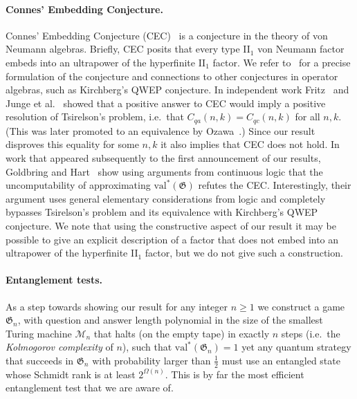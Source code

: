\documentclass[11pt]{article}
\theoremstyle{definition}
\newcommand{\val}{\ensuremath{\mathrm{val}}}
\newcommand{\game}{\mathfrak{G}}
\renewcommand{\cal}[1]{\mathcal{#1}}
\begin{document}
\paragraph{Connes' Embedding Conjecture.} 
Connes' Embedding Conjecture (CEC)~\cite{connes1976classification} is a conjecture in the theory of von Neumann algebras. Briefly, CEC posits that every type II$_1$ von Neumann factor embeds into an ultrapower of the hyperfinite II$_1$ factor. We refer to~\cite{ozawa2013connes} for a precise formulation of the conjecture and connections to other conjectures in operator algebras, such as  Kirchberg's QWEP conjecture. In independent work Fritz~\cite{fritz2012tsirelson} and Junge et al.~\cite{junge2011connes} showed that a positive answer to CEC would imply a positive resolution of Tsirelson's problem, i.e.\ that $C_{qa}(n,k)=C_{qc}(n,k)$ for all $n,k$. (This was later promoted to an equivalence by Ozawa~\cite{ozawa2013connes}.) Since our result disproves this equality for some $n,k$ it also implies that CEC does not hold. In work that appeared subsequently to the first announcement of our results, Goldbring and Hart~\cite{goldbring2016computability,goldbring2020universal} show using arguments from continuous logic that the uncomputability of approximating $\val^*(\game)$ refutes the CEC. Interestingly, their argument uses general elementary considerations from logic and completely bypasses Tsirelson's problem and its equivalence with Kirchberg's QWEP conjecture. We note that using the constructive aspect of our result it may be possible to give an explicit description of a factor that does not embed into an ultrapower of the hyperfinite II$_1$ factor, but we do not give such a construction. 

\paragraph{Entanglement tests.} As a step towards showing our result for any integer $n\geq 1$ we construct a game $\game_n$, with question and answer length polynomial in the size of the smallest Turing machine $\cal{M}_n$ that halts (on the empty tape) in exactly $n$ steps (i.e.\ the \emph{Kolmogorov complexity} of $n$), such that $\val^*(\game_n)=1$ yet any quantum strategy that succeeds in $\game_n$ with probability larger than $\frac{1}{2}$ must use an entangled state whose Schmidt rank is at least $2^{\Omega(n)}$. This is by far the most efficient entanglement test that we are aware of.
\end{document}
